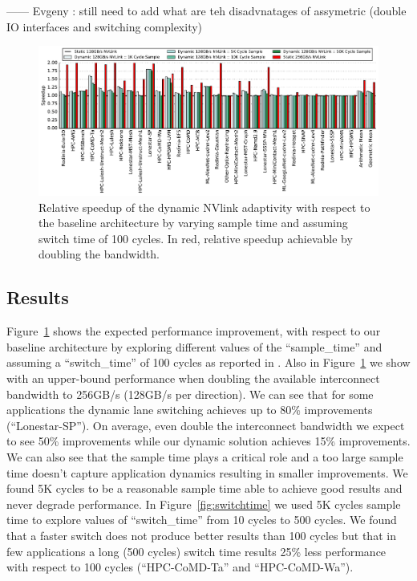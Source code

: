 ------  Evgeny : still need to add what are teh disadvnatages of assymetric
(double IO interfaces and switching complexity)

\begin{figure}[tp]
    \centering
    \includegraphics[width=1.0\textwidth]{figures/plot_nvlink_sample_time.pdf}
    \caption{Relative speedup of the dynamic NVlink adaptivity with respect to
	the baseline architecture by varying sample time and assuming switch time of
	100 cycles. In red, relative speedup achievable by doubling the bandwidth.}
    \label{fig:sampletime}
\end{figure}


 \subsection{Results}
Figure~\ref{fig:sampletime} shows the expected performance improvement, with 
respect to our baseline architecture by exploring different values 
of the ``sample\_time'' and assuming a ``switch\_time'' of 100 cycles 
as reported in \cite{REALLY_NEED_REF_HERE}. Also in Figure~\ref{fig:sampletime}
we show with an upper-bound performance when doubling
the available interconnect bandwidth to 256GB/s (128GB/s per direction). 
We can see that for some applications the dynamic lane switching achieves up to
80\% improvements (``Lonestar-SP''). On average, even double the interconnect 
bandwidth we expect to see 50\% improvements while our dynamic solution 
achieves 15\% improvements. We can also see that the sample time plays a 
critical role and a too large sample time doesn't capture application dynamics 
resulting in smaller improvements. We found 5K cycles to be a reasonable sample
time able to achieve good results and never degrade performance. 
In Figure~\ref{fig:switchtime} we used 5K cycles sample time to
explore values of ``switch\_time'' from 10 cycles to 500 cycles.
We found that a faster switch does not produce better results than 100 cycles
but that in few applications a long (500 cycles) switch time results 25\% 
less performance with respect to 100 cycles (``HPC-CoMD-Ta'' and 
``HPC-CoMD-Wa'').


